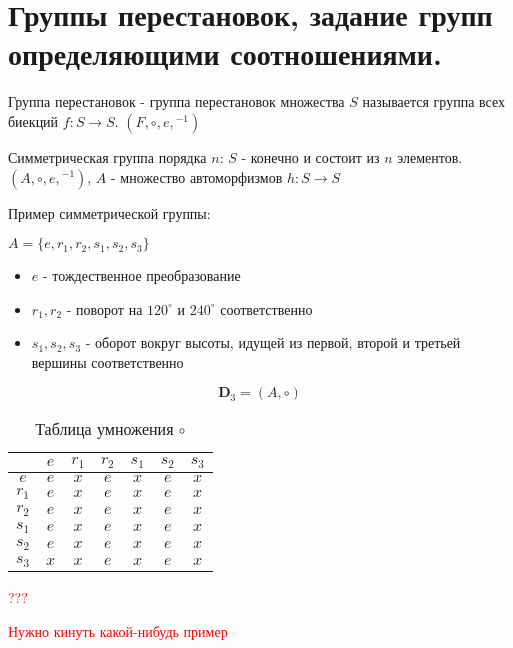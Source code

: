 \documentclass[../main/document.tex]{subfiles}
\begin{document}
\section{Группы перестановок, задание групп определяющими соотношениями.}
\begin{dfn}
Группа перестановок - группа перестановок множества $S$ называется группа всех биекций $f:S\rightarrow S$. $(F,\circ,e,{ }^{-1})$
\end{dfn}
\begin{exm}
\end{exm}
\begin{dfn}
Симметрическая группа порядка $n$: $S$ - конечно и состоит из $n$ элементов. $(A,\circ,e,{ }^{-1})$, $A$ - множество автоморфизмов $h:S\rightarrow S$
\end{dfn}
\begin{exm} \label{TriangleGroup}
Пример симметрической группы:


$A=\{e,r_1,r_2,s_1,s_2,s_3\}$
\begin{itemize}

  \item $e$ - тождественное преобразование
  \item $r_1, r_2$ - поворот на $120^{\circ}$ и $240^{\circ}$ соответственно
  \item $s_1, s_2, s_3$ - оборот вокруг высоты, идущей из первой, второй и третьей вершины соответственно
\end{itemize}

$$\mathbf{D}_3=(A,\circ)$$

\begin{table}[H]
\centering
\caption*{Таблица умножения $\circ$}
\renewcommand*{\arraystretch}{1.4}
\begin{tabular}{c|c|c|c|c|c|c}
  & $e$ & $r_1$ & $r_2$ & $s_1$& $s_2$ & $s_3$  \\ \hline
$e$ & $e$ & $x$ & $e$ & $x$& $e$ & $x$ \\ \hline
$r_1$ & $e$ & $x$ & $e$ & $x$& $e$ & $x$ \\ \hline
$r_2$ & $e$ & $x$ & $e$ & $x$& $e$ & $x$ \\ \hline
$s_1$ & $e$ & $x$ & $e$ & $x$& $e$ & $x$ \\ \hline
$s_2$ & $e$ & $x$ & $e$ & $x$& $e$ & $x$ \\ \hline
$s_3$ & $x$ & $x$& $e$ & $x$& $e$ & $x$ \\ 
\end{tabular}
\end{table}
\end{exm}
\textcolor{red}{
\begin{dfn}
???
\end{dfn}}
\textcolor{red}{
\begin{exm}
Нужно кинуть какой-нибудь пример
\end{exm}}
\end{document}
